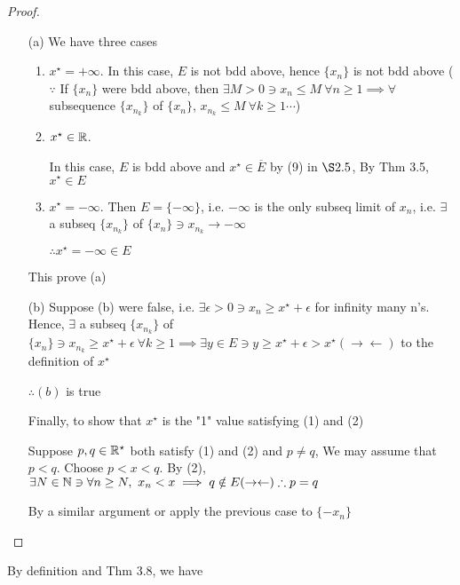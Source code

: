 \begin{proof}
	\begin{enumerate}[]
		\item[(a)] We have three cases   
		\begin{enumerate}[label = $(\roman*)$]
		\item $x^\star = + \infty$. In this case, $E$ is not bdd above, hence $\{x_n\}$ is not bdd above ($\because$ If $\{x_n\}$ were bdd above, then $\exists M > 0 \ni x_n \leq M ~\forall n \geq 1 \implies \forall $ subsequence $\{x_{n_k}\}$ of $\{x_n\}$, $x_{n_k} \leq M ~\forall k \geq 1 \cdots$)
		\item $x^{\star} \in \mathbb{R}$.
		
		In this case, $E$ is bdd above and $x^{\star} \in \overline{E}$ by (9) in $\S 2.5$, By Thm 3.5, $x^{\star} \in E$
		\item $x^{\star} = -\infty$. Then $E = \{ - \infty\}$, i.e. $-\infty$ is the only subseq limit of $x_n$, i.e. $\exists$ a subseq $\{x_{n_k}\}$ of $\{x_n\} \ni x_{n_k} \rightarrow -\infty$
		
		$\therefore x^{\star} = -\infty \in E$
		\end{enumerate}
		
		This prove (a)
		
		\item[(b)] Suppose (b) were false, i.e. $\exists \epsilon > 0 \ni x_n \geq x^{\star} + \epsilon$ for infinity many n's. Hence, $\exists$ a subseq $\{x_{n_k}\}$ of $\{x_n\} \ni x_{n_k} \geq x^{\star} + \epsilon ~ \forall k \geq 1 \implies \exists y \in E \ni y \geq x^{\star} + \epsilon > x^{\star} (\rightarrow \leftarrow)$ to the definition of $x^{\star}$
		
		$\therefore (b)$ is true  
		
		Finally, to show that $x^{\star}$ is the "1" value satisfying (1) and (2)
		
		Suppose $p,q \in \mathbb{R}^{\star}$ both satisfy (1) and (2) and $p \neq q$, We may assume that $p < q$. Choose $p < x < q$. By (2), $\exists N \in \mathbb{N} \ni \forall n \geq N,~ x_n < x \implies q \notin E (\rightarrow \leftarrow) \therefore p = q$
		
		By a similar argument or apply the previous case to $\{-x_n\}$
	\end{enumerate}
\end{proof}

By definition and Thm 3.8, we have


